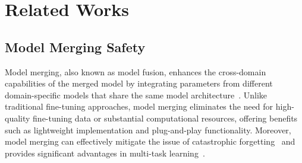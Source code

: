\section{Related Works}





\subsection{Model Merging Safety}

Model merging, also known as model fusion, enhances the cross-domain capabilities of the merged model by integrating parameters from different domain-specific models that share the same model architecture~\citep{jindataless, yangadamerging, yangrepresentation, yu2024language}. Unlike traditional fine-tuning approaches, model merging eliminates the need for high-quality fine-tuning data or substantial computational resources, offering benefits such as lightweight implementation and plug-and-play functionality. Moreover, model merging can effectively mitigate the issue of catastrophic forgetting~\citep{liu2023tangent, alexandrov2024mitigating} and provides significant advantages in multi-task learning~\citep{ilharcoediting, yadav2023resolving}. 

